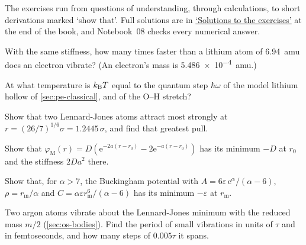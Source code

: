 \label{sec:pe-exercises}

The exercises run from questions of understanding, through calculations,
to short derivations marked `show that'. Full solutions are in
\hyperref[sec:pe-solutions]{`Solutions to the exercises'} at the end of
the book, and Notebook~08 checks every numerical answer.

\begin{exercise}
\label{ex:pe-ratio}
With the same stiffness, how many times faster than a lithium atom of
\SI{6.94}{amu} does an electron vibrate? (An electron's mass is
\SI{5.486e-4}{amu}.)
\end{exercise}

\begin{exercise}
\label{ex:pe-quantum}
At what temperature is $k_{\mathrm{B}} T$ equal to the quantum step $\hbar\omega$ of
the model lithium hollow of \cref{sec:pe-classical}, and of the O--H
stretch?
\end{exercise}

\begin{exercise}
\label{ex:pe-lj-pull}
Show that two Lennard-Jones atoms attract most strongly at $r =
(26/7)^{1/6}\sigma = 1.2445\,\sigma$, and find that greatest pull.
\end{exercise}

\begin{exercise}
\label{ex:pe-morse}
Show that $\varphi_{\mathrm M}(r) = D(\mathrm{e}^{-2a(r-r_0)} -
2\mathrm{e}^{-a(r-r_0)})$ has its minimum $-D$ at $r_0$ and the stiffness
$2Da^2$ there.
\end{exercise}

\begin{exercise}
\label{ex:pe-exp6}
Show that, for $\alpha > 7$, the Buckingham potential with $A = 6\varepsilon\,\mathrm{e}^
{\alpha}/(\alpha - 6)$, $\rho = r_{\mathrm m}/\alpha$ and $C =
\alpha\varepsilon r_{\mathrm m}^6/(\alpha - 6)$ has its minimum
$-\varepsilon$ at $r_{\mathrm m}$.
\end{exercise}

\begin{exercise}
\label{ex:pe-argon}
Two argon atoms vibrate about the Lennard-Jones minimum with the reduced
mass $m/2$ (\cref{sec:os-bodies}). Find the period of small vibrations in
units of $\tau$ and in femtoseconds, and how many steps of $0.005\tau$ it
spans.
\end{exercise}

